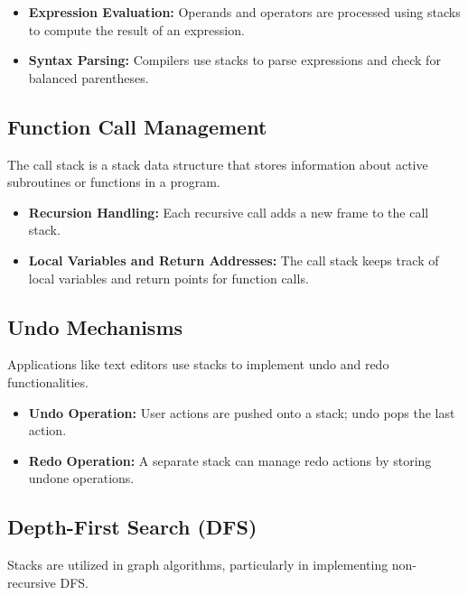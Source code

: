 \begin{itemize}
    \item \textbf{Expression Evaluation:} Operands and operators are processed using stacks to compute the result of an expression.
    \item \textbf{Syntax Parsing:} Compilers use stacks to parse expressions and check for balanced parentheses.
\end{itemize}

\subsection{Function Call Management}

The call stack is a stack data structure that stores information about active subroutines or functions in a program.

\begin{itemize}
    \item \textbf{Recursion Handling:} Each recursive call adds a new frame to the call stack.
    \item \textbf{Local Variables and Return Addresses:} The call stack keeps track of local variables and return points for function calls.
\end{itemize}

\subsection{Undo Mechanisms}

Applications like text editors use stacks to implement undo and redo functionalities.

\begin{itemize}
    \item \textbf{Undo Operation:} User actions are pushed onto a stack; undo pops the last action.
    \item \textbf{Redo Operation:} A separate stack can manage redo actions by storing undone operations.
\end{itemize}

\subsection{Depth-First Search (DFS)}

Stacks are utilized in graph algorithms, particularly in implementing non-recursive DFS.

